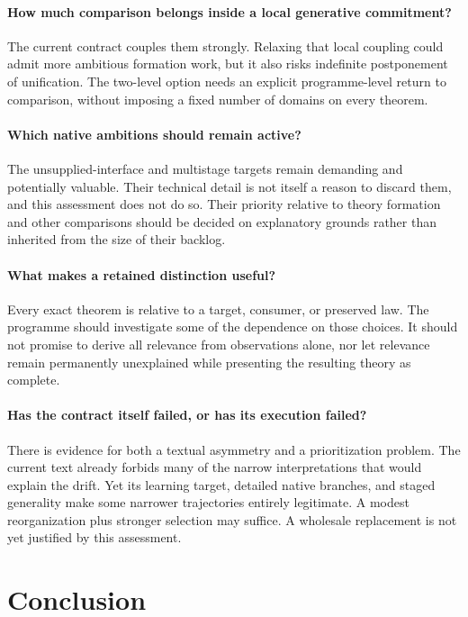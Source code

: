 \documentclass[11pt]{article}
\begin{document}
\paragraph{How much comparison belongs inside a local generative commitment?}
The current contract couples them strongly. Relaxing that local coupling could admit more ambitious formation work, but it also risks indefinite postponement of unification. The two-level option needs an explicit programme-level return to comparison, without imposing a fixed number of domains on every theorem.

\paragraph{Which native ambitions should remain active?}
The unsupplied-interface and multistage targets remain demanding and potentially valuable. Their technical detail is not itself a reason to discard them, and this assessment does not do so. Their priority relative to theory formation and other comparisons should be decided on explanatory grounds rather than inherited from the size of their backlog.

\paragraph{What makes a retained distinction useful?}
Every exact theorem is relative to a target, consumer, or preserved law. The programme should investigate some of the dependence on those choices. It should not promise to derive all relevance from observations alone, nor let relevance remain permanently unexplained while presenting the resulting theory as complete.

\paragraph{Has the contract itself failed, or has its execution failed?}
There is evidence for both a textual asymmetry and a prioritization problem. The current text already forbids many of the narrow interpretations that would explain the drift. Yet its learning target, detailed native branches, and staged generality make some narrower trajectories entirely legitimate. A modest reorganization plus stronger selection may suffice. A wholesale replacement is not yet justified by this assessment.

\section{Conclusion}
\label{sec:conclusion}
\end{document}
